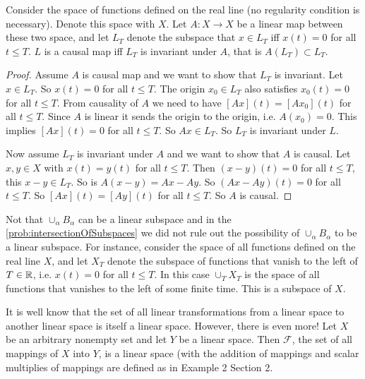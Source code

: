\begin{summary}
	Consider the space of functions defined on the real line (no regularity condition is necessary). Denote this space with $ X $. Let $ A:X\to X $ be a linear map between these two space, and let $ L_T $ denote the subspace that $ x\in L_T $ iff $ x(t) = 0 $ for all $ t\leq T $. $ L $ is a causal map iff $ L_T $ is invariant under $ A $, that is $ A(L_T) \subset L_T $.
	
	\begin{proof}
		Assume $ A $ is causal map and we want to show that $ L_T $ is invariant. Let $ x\in L_T $. So $ x(t) = 0 $ for all $ t\leq T $. The origin $ x_0 \in L_T $ also satisfies $ x_0(t)=0 $ for all $ t\leq T $. From causality of $ A $ we need to have $ [Ax](t) = [Ax_0](t) $ for all $ t\leq T $. Since $ A $ is linear it sends the origin to the origin, i.e. $ A(x_0) =0 $. This implies $ [Ax](t) =0 $ for all $ t\leq T $. So $ Ax \in L_T $. So $ L_T $ is invariant under $ L $.
		
		Now assume $ L_T $ is invariant under $ A $ and we want to show that $ A $ is causal. Let $ x,y\in X $ with $ x(t) = y(t) $ for all $ t\leq T $. Then $ (x-y)(t) = 0 $ for all $ t\leq T $, this $ x-y\in L_T $. So is $ A(x-y) = Ax - Ay $. So $ (Ax-Ay)(t) = 0 $ for all $ t\leq T $. So $ [Ax](t) = [Ay](t) $ for all $ t\leq T $. So $ A $ is causal.
	\end{proof}
\end{summary}
\begin{summary}
	Not that $ \cup_\alpha B_\alpha $ can be a linear subspace and in the \autoref{prob:intersectionOfSubspaces} we did not rule out the possibility of $ \cup_\alpha B_\alpha $ to be a linear subspace. For instance, consider the space of all functions defined on the real line $ X $, and let $ X_T $ denote the subspace of functions that vanish to the left of $ T\in\mathbb{R} $, i.e. $ x(t) = 0 $ for all $ t\leq T $. In this case $ \cup_T X_T $ is the space of all functions that vanishes to the left of some finite time. This is a subspace of $ X $.
\end{summary}


\begin{summary}
	It is well know that the set of all linear transformations from a linear space to another linear space is itself a linear space. However, there is even more! Let $ X $ be an arbitrary nonempty set and let $ Y $  be a linear space. Then $ \mathcal{F} $, the set of all mappings of $ X $ into $ Y $, is a linear space (with the addition of mappings and scalar multiplies of mappings are defined as in Example 2 Section 2. 
\end{summary}


